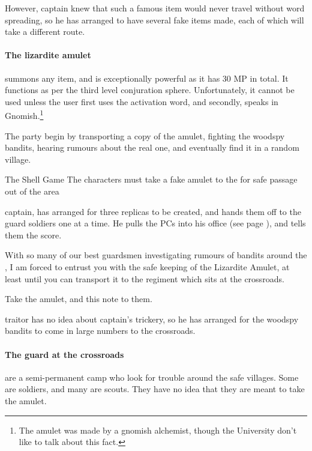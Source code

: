 \begin{multicols}{2}
However, \gls{captain} knew that such a famous item would never travel without word spreading, so he has arranged to have several fake items made, each of which will take a different route.

\paragraph{The lizardite amulet}
summons any item, and is exceptionally powerful as it has 30 MP in total.  It functions as per the third level conjuration sphere.  Unfortunately, it cannot be used unless the user first uses the activation word, and secondly, speaks in Gnomish.\footnote{The amulet was made by a gnomish alchemist, though the University don't like to talk about this fact.}


The party begin by transporting a copy of the amulet, fighting the woodspy bandits, hearing rumours about the real one, and eventually find it in a random village.

{The Shell Game}%
{The characters must take a fake amulet to the  for safe passage out of the area}%
\label{shellGame}

\Gls{captain}, has arranged for three replicas to be created, and hands them off to the \gls{guard} soldiers one at a time.
He pulls the PCs into his office (see page \pageref{guardstation}), and tells them the score.

\begin{speechtext}

  With so many of our best guardsmen investigating rumours of bandits around the , I am forced to entrust you with the safe keeping of the Lizardite Amulet, at least until you can transport it to the regiment which sits at the crossroads.

  Take the amulet, and this note to them.

\end{speechtext}

\Gls{traitor} has no idea about \gls{captain}'s trickery, so he has arranged for the woodspy bandits to come in large numbers to the crossroads.

\paragraph{The \gls{guard} at the crossroads}
are a semi-permanent camp who look for trouble around the safe villages.
Some are soldiers, and many are scouts.
They have no idea that they are meant to take the amulet.


\end{multicols}
